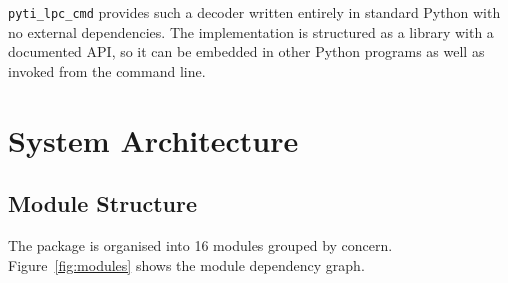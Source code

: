 \documentclass[10pt]{article}
\begin{document}
\texttt{pyti\_lpc\_cmd} provides such a decoder written entirely in standard
Python with no external dependencies.  The implementation is structured as a
library with a documented API, so it can be embedded in other Python programs
as well as invoked from the command line.

\section{System Architecture}
\label{sec:arch}

\subsection{Module Structure}

The package is organised into 16 modules grouped by concern.
Figure~\ref{fig:modules} shows the module dependency graph.
\end{document}
